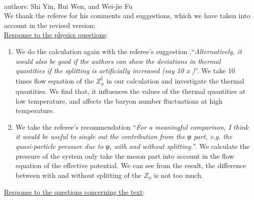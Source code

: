 \documentclass[aps,article,author-year,notitlepage,showpacs]{revtex4-1}
\begin{document}
 

\large

\\

\noindent authors: Shi Yin, Rui Wen, and Wei-jie Fu\\

\noindent We thank the referee for his comments and suggestions, which we have taken into account in the revised version:\\

\noindent \underline{Response to the physics questions}:\\

\begin{enumerate}[1.]

\item We do the calculation again with the referee's suggestion ,``{\it Alternatively, it would also be good if the authors can show the deviations in thermal quantities if the splitting is artificially increased (say 10 x )}''. We take 10 times flow equation of the $Z^\|_\phi$ in our calculation and investigate the thermal quantities. We find that, it influences the values of the thermal quantities at low temperature, and affects the baryon number fluctuations at high temperature.\\[0.3ex] 

\item We take the referee's recommendation ``{\it For a meaningful comparison, I think it would be useful to single out the contribution from the φ part, e.g. the quasi-particle pressure due to φ, with and without splitting.}''. We calculate the pressure of the system only take the meson part into account in the flow equation of the effective potential. We can see from the result, the difference between with and without splitting of the $Z_\phi$ is not too much.
\end{enumerate}


\noindent \underline{Response to the questions concerning the text}:\\
\end{document}
